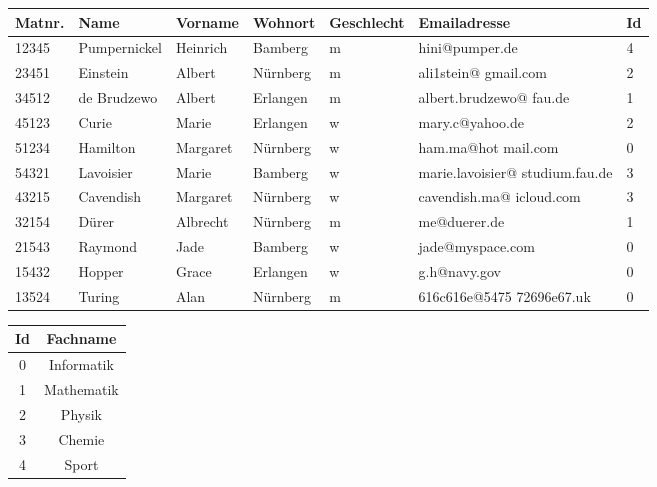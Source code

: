 \begin{tabular}{lllllp{3cm}l}
	\hline\hline
	Matnr. & Name         & Vorname  & Wohnort  & Geschlecht & Emailadresse                    & Id \\ \hline\hline
	12345  & Pumpernickel & Heinrich & Bamberg  & m          & hini@pumper.de                  & 4  \\ \hline
	23451  & Einstein     & Albert   & Nürnberg & m          & ali1stein@ gmail.com            & 2  \\ \hline
	34512  & de Brudzewo  & Albert   & Erlangen & m          & albert.brudzewo@ fau.de         & 1  \\ \hline
	45123  & Curie        & Marie    & Erlangen & w          & mary.c@yahoo.de                 & 2  \\ \hline
	51234  & Hamilton     & Margaret & Nürnberg & w          & ham.ma@hot mail.com             & 0  \\ \hline
	54321  & Lavoisier    & Marie    & Bamberg  & w          & marie.lavoisier@ studium.fau.de & 3  \\ \hline
	43215  & Cavendish    & Margaret & Nürnberg & w          & cavendish.ma@ icloud.com        & 3  \\ \hline
	32154  & Dürer        & Albrecht & Nürnberg & m          & me@duerer.de                    & 1  \\ \hline
	21543  & Raymond      & Jade     & Bamberg  & w          & jade@myspace.com                & 0  \\ \hline
	15432  & Hopper       & Grace    & Erlangen & w          & g.h@navy.gov                    & 0  \\ \hline
	13524  & Turing       & Alan     & Nürnberg & m          & 616c616e@5475 72696e67.uk       & 0  \\ \hline
\end{tabular}

\begin{tabular}{|c|c|}
	\hline
	Id & Fachname \\
	\hline
	0 & Informatik \\
	\hline
	1 & Mathematik \\
	\hline
	2 & Physik \\
	\hline
	3 & Chemie \\
	\hline
	4 & Sport\\
	\hline
\end{tabular}

